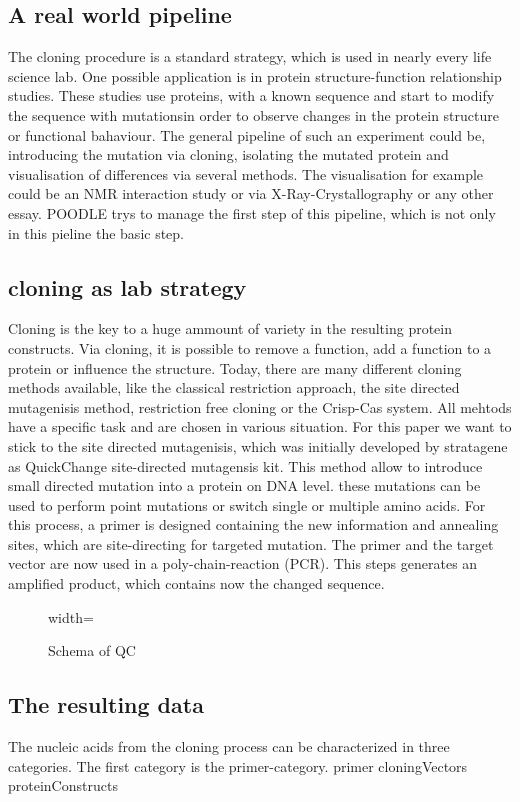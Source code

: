 \documentclass{bioinfo}
\begin{document}
\subsection{A real world pipeline}
The cloning procedure is a standard strategy, which is used in nearly every life science lab. One possible application is in protein structure-function relationship studies. These studies use proteins, with a known sequence and start to modify the sequence with mutationsin order to observe changes  in the protein structure or functional bahaviour. The general pipeline of such an experiment could be, introducing the mutation via cloning, isolating the mutated protein and visualisation of differences via several methods. The visualisation for example could be an NMR interaction study or via X-Ray-Crystallography or any other essay. POODLE trys to manage the first  step of this pipeline, which is not only in this pieline the basic step.
\subsection{cloning as lab strategy}
Cloning is the key to a huge ammount of variety in the resulting protein constructs. Via cloning, it is possible to remove a function, add a function to a protein or influence the structure. Today, there are many different cloning methods available, like the classical restriction approach, the site directed mutagenisis method, restriction free cloning or the Crisp-Cas system. All mehtods have a specific task and are chosen in various situation. For this paper we want to stick to the site directed mutagenisis, which was initially developed by stratagene as QuickChange site-directed mutagensis kit. This method allow to introduce small directed mutation into a protein on DNA level. these mutations can be used to perform point mutations or switch single or multiple amino acids.
For this process, a primer is designed containing the new information and annealing sites, which are site-directing for targeted mutation. The primer and the target vector are now used in a poly-chain-reaction (PCR). This steps generates an amplified product, which contains now the changed sequence.

\begin{figure}
	{width=\textwidth}
	\caption{Schema of QC}
	\label{QC-pic}
\end{figure}

\subsection{The resulting data}
The nucleic acids from the cloning process can be characterized in three categories. The first category is the primer-category.
primer
cloningVectors
proteinConstructs
\end{document}
